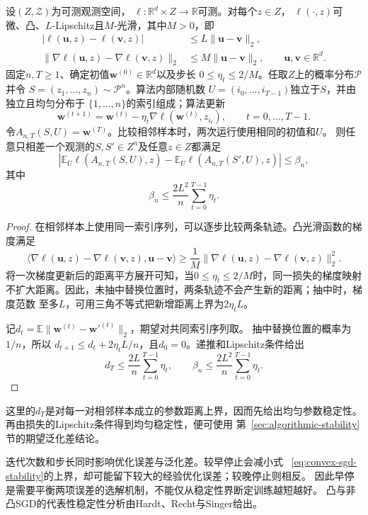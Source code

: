 \begin{theorem}[凸光滑SGD的稳定性]
\label{thm:convex-sgd-stability}
设$(Z,\mathcal Z)$为可测观测空间，
$\ell:\mathbb R^d\times Z\to\mathbb R$可测。对每个$z\in Z$，
$\ell(\cdot,z)$可微、凸、$L$-Lipschitz且$M$-光滑，其中$M>0$，即
\[
\begin{aligned}
 |\ell(\bm u,z)-\ell(\bm v,z)|
 &\leq L\|\bm u-\bm v\|_2,\\
 \|\nabla\ell(\bm u,z)-\nabla\ell(\bm v,z)\|_2
 &\leq M\|\bm u-\bm v\|_2,
 \qquad \bm u,\bm v\in\mathbb R^d.
\end{aligned}
\]
固定$n,T\geq1$、确定初值$\bm w^{(0)}\in\mathbb R^d$以及步长
$0\leq\eta_t\leq2/M$。任取$Z$上的概率分布$\mathcal P$并令
$S=(z_1,\ldots,z_n)\sim\mathcal P^n$。算法内部随机数
$U=(i_0,\ldots,i_{T-1})$独立于$S$，并由独立且均匀分布于
$\{1,\ldots,n\}$的索引组成；算法更新
\[
 \bm w^{(t+1)}
 =\bm w^{(t)}-\eta_t\nabla\ell(\bm w^{(t)},z_{i_t}),
 \qquad t=0,\ldots,T-1.
\]
令$A_{n,T}(S,U)=\bm w^{(T)}$。比较相邻样本时，两次运行使用相同的初值和$U$。
则任意只相差一个观测的$S,S'\in Z^n$及任意$z\in Z$都满足
\[
 \left|\mathbb E_U\ell(A_{n,T}(S,U),z)
 -\mathbb E_U\ell(A_{n,T}(S',U),z)\right|\leq\beta_n,
\]
其中
\[
 \beta_n\leq\frac{2L^2}{n}\sum_{t=0}^{T-1}\eta_t.
\]
\end{theorem}
\begin{proof}
在相邻样本上使用同一索引序列，可以逐步比较两条轨迹。凸光滑函数的梯度满足
\[
 \langle\nabla\ell(\bm u,z)-\nabla\ell(\bm v,z),\bm u-\bm v\rangle
 \geq\frac1M\|\nabla\ell(\bm u,z)-\nabla\ell(\bm v,z)\|_2^2.
\]
将一次梯度更新后的距离平方展开可知，当$0\leq\eta_t\leq2/M$时，同一损失的梯度映射
不扩大距离。因此，未抽中替换位置时，两条轨迹不会产生新的距离；抽中时，梯度范数
至多$L$，可用三角不等式把新增距离上界为$2\eta_tL$。

记$d_t=\mathbb E\|\bm w^{(t)}-\bm w'^{(t)}\|_2$，期望对共同索引序列取。
抽中替换位置的概率为$1/n$，所以
$d_{t+1}\leq d_t+2\eta_tL/n$，且$d_0=0$。递推和Lipschitz条件给出
\begin{equation}
 d_T\leq\frac{2L}{n}\sum_{t=0}^{T-1}\eta_t,
 \qquad
 \beta_n\leq\frac{2L^2}{n}\sum_{t=0}^{T-1}\eta_t.
 \label{eq:convex-sgd-stability}
\end{equation}
\end{proof}

这里的$d_T$是对每一对相邻样本成立的参数距离上界，因而先给出均匀参数稳定性。
再由损失的Lipschitz条件得到均匀稳定性，便可使用
第~\ref{sec:algorithmic-stability}节的期望泛化差结论。

迭代次数和步长同时影响优化误差与泛化差。较早停止会减小式
~\eqref{eq:convex-sgd-stability}的上界，却可能留下较大的经验优化误差；较晚停止则相反。
因此早停是需要平衡两项误差的选解机制，不能仅从稳定性界断定训练越短越好。
凸与非凸SGD的代表性稳定性分析由Hardt、Recht与Singer给出。


